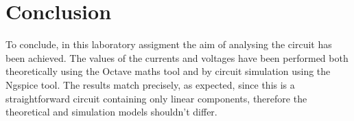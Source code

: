 \section{Conclusion}
\label{sec:conclusion}

To conclude, in this laboratory assigment the aim of analysing the circuit has been achieved. The values of the currents and voltages have been performed both theoretically using the Octave maths tool and by circuit simulation using the Ngspice tool. The results match precisely, as expected, since this is a straightforward circuit containing only linear components, therefore the theoretical and simulation models shouldn't differ. 


\lipsum[1-1]
